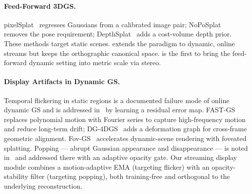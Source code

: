 \paragraph{Feed-Forward 3DGS.}
pixelSplat~\cite{charatan2024pixelsplat} regresses Gaussians from a
calibrated image pair; NoPoSplat~\cite{ye2024noposplat} removes the pose
requirement; DepthSplat~\cite{chen2024depthsplat} adds a cost-volume depth
prior. These methods target static scenes. \StreamSplat extends the
paradigm to dynamic, online streams but keeps the orthographic canonical
space. \StereoSplat is the first to bring the feed-forward dynamic
setting into metric scale via stereo.

\paragraph{Display Artifacts in Dynamic GS.}
Temporal flickering in static regions is a documented failure mode of
online dynamic GS and is addressed in~\cite{yun2025compensating} by
learning a residual error map. FAST-GS~\cite{zhang2026fastgs} replaces
polynomial motion with Fourier series to capture high-frequency motion
and reduce long-term drift; DG-4DGS~\cite{chen2026dg4dgs} adds a
deformation graph for cross-frame geometric alignment.
Fov-GS~\cite{fan2025fovgs} accelerates dynamic-scene rendering with
foveated splatting. Popping --- abrupt Gaussian appearance and
disappearance --- is noted in~\cite{wu2026streamsplat} and addressed there
with an adaptive opacity gate. Our streaming display module combines a
motion-adaptive EMA (targeting flicker) with an opacity-stability filter
(targeting popping), both training-free and orthogonal to the underlying
reconstruction.
